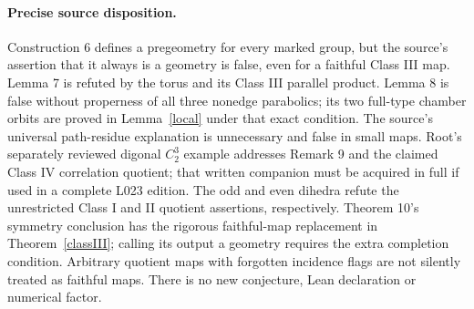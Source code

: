 \documentclass[11pt,a4paper]{article}
\begin{document}
\paragraph{Precise source disposition.}
Construction 6 defines a pregeometry for every marked group, but the
source's assertion that it always is a geometry is false, even for
a faithful Class III map. Lemma 7 is refuted by the torus and its
Class III parallel product. Lemma 8 is false without properness of
all three nonedge parabolics; its two full-type chamber orbits are
proved in Lemma~\ref{local} under that exact condition. The source's
universal path-residue explanation is unnecessary and false in small
maps. Root's separately reviewed digonal $C_2^3$ example addresses
Remark 9 and the claimed Class IV correlation quotient; that written
companion must be acquired in full if used in a complete L023 edition.
The odd and even dihedra refute the unrestricted Class I and II
quotient assertions, respectively.
Theorem 10's symmetry conclusion has the rigorous faithful-map
replacement in Theorem~\ref{classIII}; calling its output a geometry
requires the extra completion condition. Arbitrary quotient maps with
forgotten incidence flags are not silently treated as faithful maps.
There is no new conjecture, Lean declaration or numerical factor.
\end{document}
